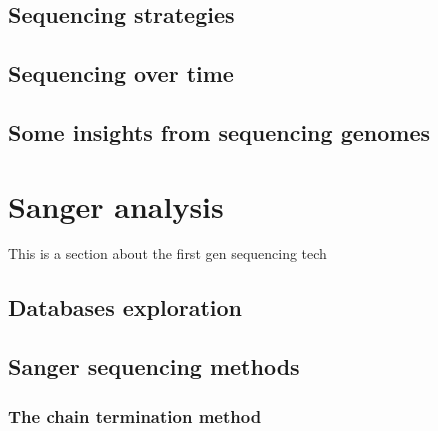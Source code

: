 \documentclass[
  letterpaper,
]{scrbook}
\begin{document}
\hypertarget{sequencing-strategies}{%
\section*{Sequencing strategies}\label{sequencing-strategies}}

\hypertarget{sequencing-over-time}{%
\section*{Sequencing over time}\label{sequencing-over-time}}

\hypertarget{some-insights-from-sequencing-genomes}{%
\section*{Some insights from sequencing
genomes}\label{some-insights-from-sequencing-genomes}}

\hypertarget{sanger-analysis}{%
\chapter{Sanger analysis}\label{sanger-analysis}}

This is a section about the first gen sequencing tech

\hypertarget{databases-exploration}{%
\section*{Databases exploration}\label{databases-exploration}}

\hypertarget{sanger-sequencing-methods}{%
\section*{Sanger sequencing methods}\label{sanger-sequencing-methods}}

\hypertarget{the-chain-termination-method}{%
\subsection*{The chain termination
method}\label{the-chain-termination-method}}
\end{document}
